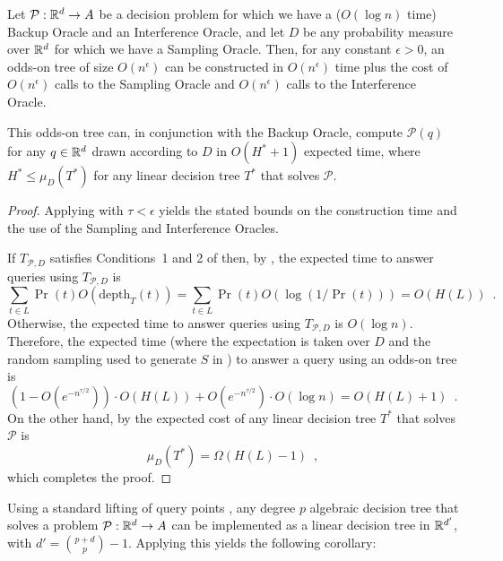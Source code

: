 \documentclass{patmorin}
\newcommand{\depth}{\mathrm{depth}}
\begin{document}
\begin{thm}
  Let $\mathcal{P}:\mathbb{R}^d\rightarrow A$ be a decision problem for which we
  have a ($O(\log n)$ time) Backup Oracle and an Interference Oracle,
  and let $D$ be any probability measure over $\mathbb{R}^d$ for which we have
  a Sampling Oracle.  Then, for any constant $\epsilon > 0$,  an odds-on
  tree of size $O(n^\epsilon)$ can be constructed in $O(n^\epsilon)$ time
  plus the cost of $O(n^\epsilon)$ calls to the Sampling Oracle and
  $O(n^\epsilon)$ calls to the Interference Oracle.

  This odds-on tree can, in conjunction with the Backup Oracle, compute
  $\mathcal{P}(q)$ for any $q\in\mathbb{R}^d$ drawn according to $D$ in $O(H^*+1)$
  expected time, where $H^* \le \mu_D(T^*)$ for any linear decision tree
  $T^*$ that solves $\mathcal{P}$.
\end{thm}

\begin{proof}
  Applying  with $\tau < \epsilon$
  yields the stated bounds on the construction time and the use of the
  Sampling and Interference Oracles.

  If $T_{\mathcal{P},D}$ satisfies Conditions~1 and 2 of
   then, by , the expected
  time to answer queries using $T_{\mathcal{P},D}$ is
  \[
     \sum_{t\in L} \Pr(t)O(\depth_T(t)) 
          = \sum_{t\in L}\Pr(t)O(\log(1/\Pr(t))) = O(H(L)) \enspace .
  \]
  Otherwise, the expected time to answer queries using $T_{\mathcal{P},D}$
  is $O(\log n)$.  Therefore, the expected time (where the expectation
  is taken over $D$ and the random sampling used to generate $S$ in
  ) to answer a query using an odds-on tree is
  \[
     (1-O(e^{-n^{\tau/2}}))\cdot O(H(L)) + O(e^{-n^{\tau/2}})\cdot O(\log n) =
        O(H(L)+1)  \enspace .
  \]
  On the other hand, by  the expected cost of any
  linear decision tree $T^*$ that solves $\mathcal{P}$ is
  \[
      \mu_D(T^*) = \Omega(H(L) - 1) \enspace ,
  \]
  which completes the proof.
\end{proof}

Using a standard lifting of query points \cite{yy85}, any degree $p$
algebraic decision tree that solves a problem $\mathcal{P}:\mathbb{R}^d\rightarrow
A$ can be implemented as a linear decision tree in $\mathbb{R}^{d'}$, with
$d'={p+d\choose p}-1$.  Applying this yields the following corollary:
\end{document}
